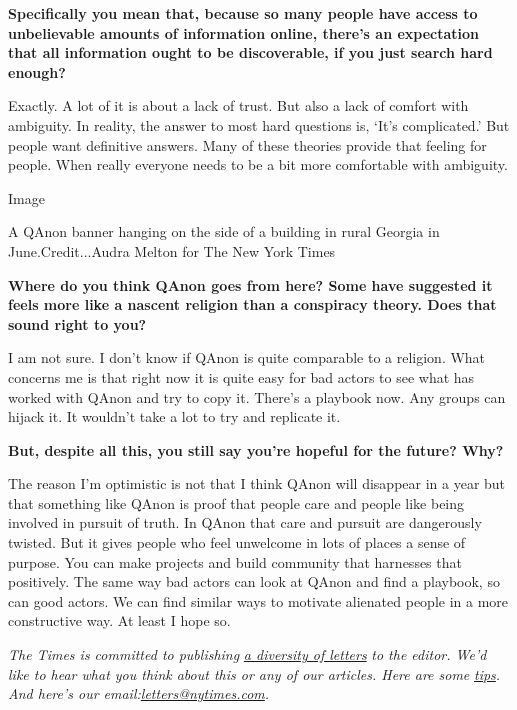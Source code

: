 \textbf{Specifically you mean that, because so many people have access
to unbelievable amounts of information online, there's an expectation
that all information ought to be discoverable, if you just search hard
enough?}

Exactly. A lot of it is about a lack of trust. But also a lack of
comfort with ambiguity. In reality, the answer to most hard questions
is, `It's complicated.' But people want definitive answers. Many of
these theories provide that feeling for people. When really everyone
needs to be a bit more comfortable with ambiguity.

Image

A QAnon banner hanging on the side of a building in rural Georgia in
June.Credit...Audra Melton for The New York Times

\textbf{Where do you think QAnon goes from here? Some have suggested it
feels more like a nascent religion than a conspiracy theory. Does that
sound right to you?}

I am not sure. I don't know if QAnon is quite comparable to a religion.
What concerns me is that right now it is quite easy for bad actors to
see what has worked with QAnon and try to copy it. There's a playbook
now. Any groups can hijack it. It wouldn't take a lot to try and
replicate it.

\textbf{But, despite all this, you still say you're hopeful for the
future? Why?}

The reason I'm optimistic is not that I think QAnon will disappear in a
year but that something like QAnon is proof that people care and people
like being involved in pursuit of truth. In QAnon that care and pursuit
are dangerously twisted. But it gives people who feel unwelcome in lots
of places a sense of purpose. You can make projects and build community
that harnesses that positively. The same way bad actors can look at
QAnon and find a playbook, so can good actors. We can find similar ways
to motivate alienated people in a more constructive way. At least I hope
so.

\emph{The Times is committed to publishing}
\href{https://www.nytimes.com/2019/01/31/opinion/letters/letters-to-editor-new-york-times-women.html}{\emph{a
diversity of letters}} \emph{to the editor. We'd like to hear what you
think about this or any of our articles. Here are some}
\href{https://help.nytimes.com/hc/en-us/articles/115014925288-How-to-submit-a-letter-to-the-editor}{\emph{tips}}\emph{.
And here's our
email:}\href{mailto:letters@nytimes.com}{\emph{letters@nytimes.com}}\emph{.}

